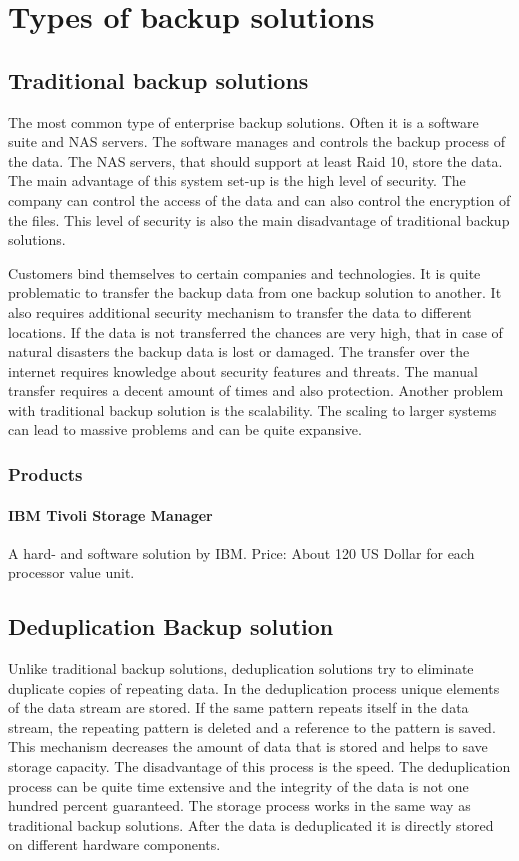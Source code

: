 \section{Types of backup solutions}

\subsection{Traditional backup solutions}
The most common type of enterprise backup solutions. Often it is a
software suite and NAS servers. The software manages and controls the
backup process of the data. The NAS servers, that should support at
least Raid 10, store the data. The main advantage of this system set-up
is the high level of security. The company can control the access of the
data and can also control the encryption of the files. This level of
security is also the main disadvantage of traditional backup solutions.

Customers bind themselves to certain companies and technologies. It is
quite problematic to transfer the backup data from one backup solution
to another. It also requires additional security mechanism to transfer
the data to different locations.  If the data is not transferred the
chances are very high, that in case of natural disasters the backup data
is lost or damaged. The transfer over the internet requires knowledge
about security features and threats. The manual transfer requires a
decent amount of times and also protection. Another problem with
traditional backup solution is the scalability. The scaling to larger
systems can lead to massive problems and can be quite expansive.

\subsubsection{Products} 

\paragraph{IBM Tivoli Storage Manager} A hard- and software
solution by IBM. Price: About 120 US Dollar for each processor value
unit.

\subsection{Deduplication Backup solution}
Unlike traditional backup solutions, deduplication solutions try to
eliminate duplicate copies of repeating data. In the deduplication
process unique elements of the data stream are stored. If the same
pattern repeats itself in the data stream, the repeating pattern is
deleted and a reference to the  pattern is saved\cite{WikiDe}. This
mechanism decreases the amount of data that is stored and helps to save
storage capacity. The disadvantage of this process is the speed. The
deduplication process can be quite time extensive and the integrity of
the data is not one hundred percent guaranteed. The storage process
works in the same way as traditional backup solutions. After the data is
deduplicated it is directly stored on different hardware components.

